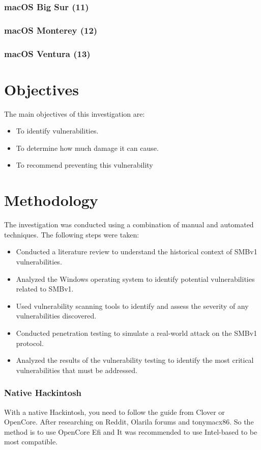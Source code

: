 \documentclass[12pt, letterpaper]{article}
\begin{document}
\subsubsection{macOS Big Sur (11)}

\subsubsection{macOS Monterey (12)}

\subsubsection{macOS Ventura (13)}

\newpage

\section{Objectives}
The main objectives of this investigation are:
\begin{itemize}
    \item To identify vulnerabilities.
    \item To determine how much damage it can cause.
    \item To recommend preventing this vulnerability 
\end{itemize}

\newpage
\section{Methodology}
The investigation was conducted using a combination of manual and automated techniques. The following steps were taken:

\begin{itemize}
\item Conducted a literature review to understand the historical context of SMBv1 vulnerabilities.
\item Analyzed the Windows operating system to identify potential vulnerabilities related to SMBv1.
\item Used vulnerability scanning tools to identify and assess the severity of any vulnerabilities discovered.
\item Conducted penetration testing to simulate a real-world attack on the SMBv1 protocol.
\item Analyzed the results of the vulnerability testing to identify the most critical vulnerabilities that must be addressed.
\end{itemize}
\subsubsection{Native Hackintosh}
With a native Hackintosh, you need to follow the guide from Clover or OpenCore. After researching on Reddit, Olarila forums and tonymacx86. So the method is to use OpenCore Efi and It was recommended to use Intel-based to be most compatible.
\end{document}
